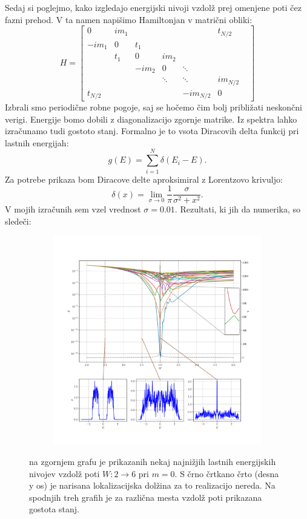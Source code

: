 Sedaj si poglejmo, kako izgledajo energijski nivoji vzdolž prej omenjene poti čez fazni prehod. 
V ta namen napišimo Hamiltonjan v matrični obliki:
\[
H = \begin{bmatrix} 
0 & i m_1 &  &  &  & t_{N/2}\\
-i m_1 & 0 & t_1 &  & &  \\
 & t_1 & 0 & im_2 &  &  \\
 &  & -im_2 & 0& \ddots&  & \\
 &  &  & \ddots & \ddots & im_{N/2}  \\
t_{N/2} & & &  & -i m_{N/2} & 0  
    \end{bmatrix}
\]
Izbrali smo periodične robne pogoje, saj se hočemo čim bolj približati neskončni verigi. Energije bomo dobili z diagonalizacijo zgornje matrike.
Iz spektra lahko izračunamo tudi gostoto stanj. Formalno je to vsota Diracovih delta funkcij pri lastnih energijah:
\begin{equation}
g(E) = \sum_{i=1}^N \delta (E_i - E).
\end{equation}
Za potrebe prikaza bom Diracove delte aproksimiral z Lorentzovo krivuljo:
\begin{equation}
\delta (x) = \lim_{\sigma \to 0} \frac{1}{\pi} \frac{\sigma}{\sigma^2 + x^2}.
\end{equation}
V mojih izračunih sem vzel vrednost $\sigma=0.01$.
Rezultati, ki jih da numerika, so sledeči:
\begin{figure}[H]
\centering
\begin{subfigure}{\textwidth}
\includegraphics[width=\linewidth]{Figures/Nicegraph.pdf}
\end{subfigure}
\caption{na zgornjem grafu je prikazanih nekaj najnižjih lastnih energijskih nivojev vzdolž poti $W: 2 \to 6$ pri $m=0$. S črno črtkano črto (desna y os) je narisana lokalizacijska dolžina za to realizacijo nereda. Na spodnjih treh grafih je za različna mesta vzdolž poti prikazana gostota stanj.}
\label{fig:Nicegraph}
\end{figure}

